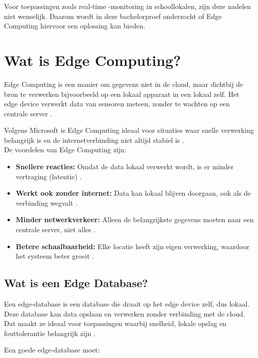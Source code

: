 Voor toepassingen zoals real-time -monitoring in schoollokalen, zijn deze nadelen niet wenselijk. Daarom wordt in deze bachelorproef onderzocht of Edge Computing hiervoor een oplossing kan bieden.

\section{Wat is Edge Computing?}
\label{sec:edge-computing}

Edge Computing is een manier om gegevens niet in de cloud, maar dichtbij de bron te verwerken bijvoorbeeld op een lokaal apparaat in een lokaal zelf. Het edge device verwerkt data van sensoren meteen, zonder te wachten op een centrale server \autocite{Shi2016}.

Volgens Microsoft is Edge Computing ideaal voor situaties waar snelle verwerking belangrijk is en de internetverbinding niet altijd stabiel is \autocite{MicrosoftEdgeDefinition}.\\
De voordelen van Edge Computing zijn:

\begin{itemize}
    \item \textbf{Snellere reacties:} Omdat de data lokaal verwerkt wordt, is er minder vertraging (latentie) \autocite{Taheri2020}.
    \item \textbf{Werkt ook zonder internet:} Data kan lokaal blijven doorgaan, ook als de verbinding wegvalt \autocite{Rahmani2018}.
    \item \textbf{Minder netwerkverkeer:} Alleen de belangrijkste gegevens moeten naar een centrale server, niet alles \autocite{Shi2016}.
    \item \textbf{Betere schaalbaarheid:} Elke locatie heeft zijn eigen verwerking, waardoor het systeem beter groeit \autocite{Taheri2020}.
\end{itemize}

\subsection{Wat is een Edge Database?}
\label{sec:edge-database}

Een edge-database is een database die draait op het edge device zelf, dus lokaal. Deze database kan data opslaan en verwerken zonder verbinding met de cloud. Dat maakt ze ideaal voor toepassingen waarbij snelheid, lokale opslag en fouttolerantie belangrijk zijn \autocite{Rahmani2018}.

Een goede edge-database moet:

